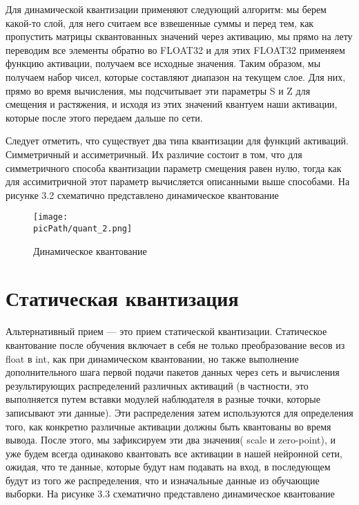 \documentclass[oneside,final,12pt]{extreport}
\newcommand{\picPath}{images}
\begin{document}
Для динамической квантизации применяют следующий алгоритм: мы берем какой-то слой, для него считаем все взвешенные суммы и перед тем, как пропустить матрицы сквантованных значений через активацию, мы прямо на лету переводим все элементы обратно во FLOAT32 и для этих FLOAT32 применяем функцию активации, получаем все исходные значения.  Таким образом, мы получаем набор чисел, которые составляют диапазон на текущем слое. Для них, прямо во время вычисления, мы подсчитывает эти параметры S и Z для смещения и растяжения, и исходя из этих значений квантуем наши активации, которые после этого передаем дальше по сети.

Следует отметить, что существует два типа квантизации для функций активаций. Симметричный и ассиметричный. Их различие состоит в том, что для симметричного способа квантизации параметр смещения равен нулю, тогда как для ассимитричной этот параметр вычисляется описанными выше способами. На рисунке 3.2 схематично представлено динамическое квантование

\begin{figure}[H]
\begin{center}
  \texttt{[image: \\picPath/quant\_2.png]}
  \caption{Динамическое квантование}
  \label{fig:quant_2}
  \end{center}
\end{figure}

\section{Статическая квантизация}
Альтернативный прием — это прием статической квантизации. Статическое квантование после обучения включает в себя не только преобразование весов из float в int, как при динамическом квантовании, но также выполнение дополнительного шага первой подачи пакетов данных через сеть и вычисления результирующих распределений различных активаций (в частности, это выполняется путем вставки модулей наблюдателя в разные точки, которые записывают эти данные). Эти распределения затем используются для определения того, как конкретно различные активации должны быть квантованы во время вывода. После этого, мы зафиксируем эти два значения( scale и zero-point), и уже будем всегда одинаково квантовать все активации в нашей нейронной сети, ожидая, что те данные, которые будут нам подавать на вход, в последующем будут из того же распределения, что и изначальные данные из обучающие выборки. На рисунке 3.3 схематично представлено динамическое квантование
\end{document}
